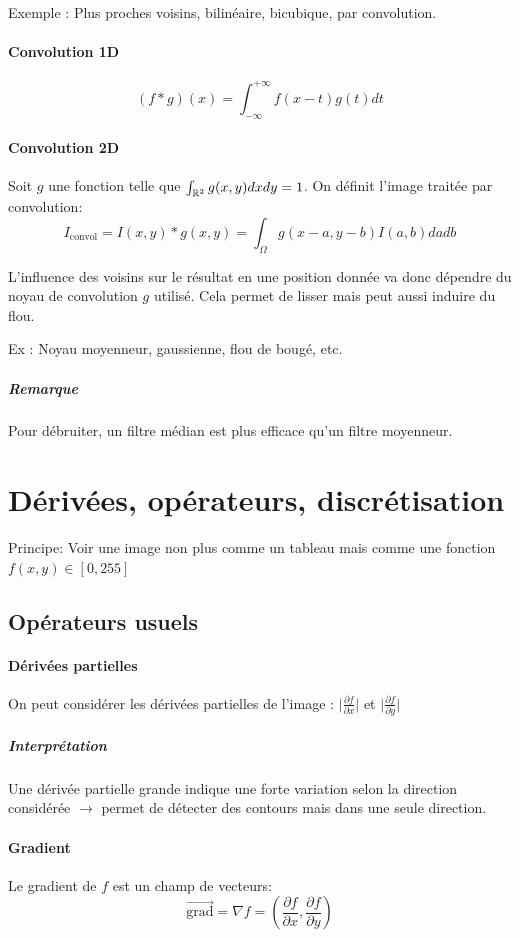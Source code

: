 \documentclass[french]{article}
\begin{document}
Exemple : Plus proches voisins, bilinéaire, bicubique, par convolution.

\paragraph{Convolution 1D}
$$(f * g)(x) = \int_{-\infty}^{+\infty}f(x-t) g(t) dt$$

\paragraph{Convolution 2D}
Soit $g$ une fonction telle que $\int_{\Bbb{R}^2}g(x,y)dxdy=1$.
On définit l'image traitée par convolution:
$$I_{\text{convol}} = I(x,y) * g(x, y) = \int_{\Omega}g(x - a, y -b) I(a,b) da db$$

L'influence des voisins sur le résultat en une position donnée va donc
dépendre du noyau de convolution $g$ utilisé. Cela permet de lisser mais
peut aussi induire du flou.

Ex : Noyau moyenneur, gaussienne, flou de bougé, etc.

\subparagraph{Remarque} Pour débruiter, un filtre médian est plus
efficace qu'un filtre moyenneur.

\section{Dérivées, opérateurs, discrétisation}
Principe: Voir une image non plus comme un tableau mais comme une fonction
$f(x,y) \in [0, 255]$


\subsection{Opérateurs usuels}

\paragraph{Dérivées partielles}
On peut considérer les dérivées partielles de l'image :
$\vert \frac{\partial f}{\partial x} \vert$ et $\vert \frac{\partial f}{\partial y} \vert$

\subparagraph{Interprétation} Une dérivée partielle grande indique une forte
variation selon la direction considérée $\longrightarrow$ permet de
détecter des contours mais dans une seule direction.

\paragraph{Gradient} Le gradient de $f$ est un champ de vecteurs:
$$\vec{\text{grad}} = \nabla f =
\left(\frac{\partial f}{\partial x}, \frac{\partial f}{\partial y} \right)$$
\end{document}

